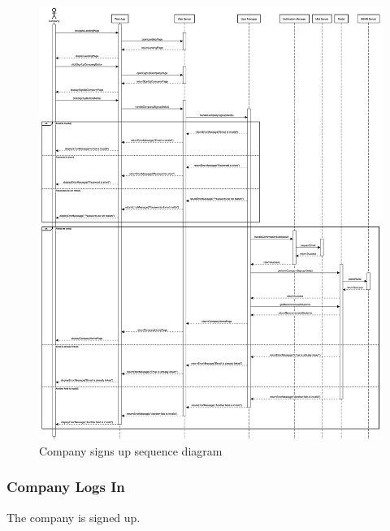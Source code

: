 \begin{figure}[h!]
    \centering
    \includegraphics[width=14cm]{images/sequence-diagrams/company-signs-up.png}
    \caption{Company signs up sequence diagram}
\end{figure}

\clearpage
\subsubsection{Company Logs In}
The company is signed up.

